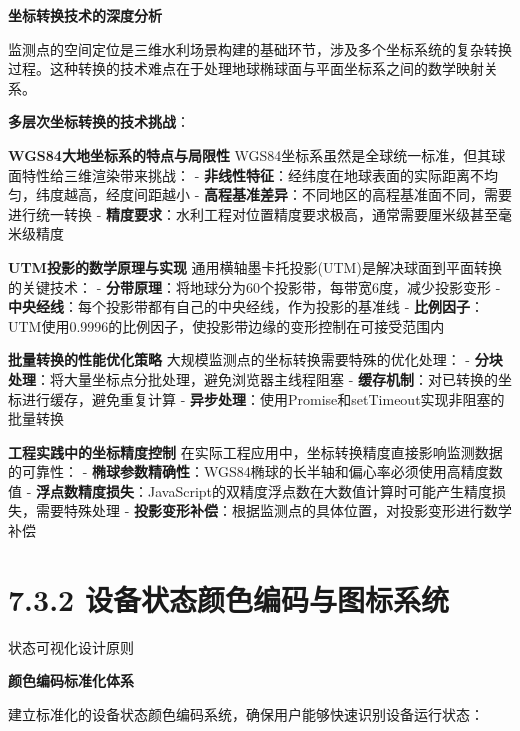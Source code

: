 \textbf{坐标转换技术的深度分析}

监测点的空间定位是三维水利场景构建的基础环节，涉及多个坐标系统的复杂转换过程。这种转换的技术难点在于处理地球椭球面与平面坐标系之间的数学映射关系。

\textbf{多层次坐标转换的技术挑战}：

\textbf{WGS84大地坐标系的特点与局限性} WGS84坐标系虽然是全球统一标准，但其球面特性给三维渲染带来挑战： - \textbf{非线性特征}：经纬度在地球表面的实际距离不均匀，纬度越高，经度间距越小 - \textbf{高程基准差异}：不同地区的高程基准面不同，需要进行统一转换 - \textbf{精度要求}：水利工程对位置精度要求极高，通常需要厘米级甚至毫米级精度

\textbf{UTM投影的数学原理与实现} 通用横轴墨卡托投影(UTM)是解决球面到平面转换的关键技术： - \textbf{分带原理}：将地球分为60个投影带，每带宽6度，减少投影变形 - \textbf{中央经线}：每个投影带都有自己的中央经线，作为投影的基准线 - \textbf{比例因子}：UTM使用0.9996的比例因子，使投影带边缘的变形控制在可接受范围内

\textbf{批量转换的性能优化策略} 大规模监测点的坐标转换需要特殊的优化处理： - \textbf{分块处理}：将大量坐标点分批处理，避免浏览器主线程阻塞 - \textbf{缓存机制}：对已转换的坐标进行缓存，避免重复计算 - \textbf{异步处理}：使用Promise和setTimeout实现非阻塞的批量转换

\textbf{工程实践中的坐标精度控制} 在实际工程应用中，坐标转换精度直接影响监测数据的可靠性： - \textbf{椭球参数精确性}：WGS84椭球的长半轴和偏心率必须使用高精度数值 - \textbf{浮点数精度损失}：JavaScript的双精度浮点数在大数值计算时可能产生精度损失，需要特殊处理 - \textbf{投影变形补偿}：根据监测点的具体位置，对投影变形进行数学补偿

\section{7.3.2 设备状态颜色编码与图标系统}

 状态可视化设计原则

\textbf{颜色编码标准化体系}

建立标准化的设备状态颜色编码系统，确保用户能够快速识别设备运行状态：

